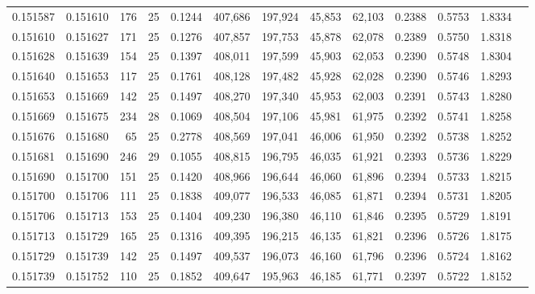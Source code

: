 \begin{tabular}{rrrrrrrrrrrrr}
0.151587 & 0.151610 & 176 &  25 &                                     0.1244 & 407,686 & 197,924 &  45,853 &  62,103 & 0.2388 & 0.5753 & 1.8334 \\
0.151610 & 0.151627 & 171 &  25 &                                     0.1276 & 407,857 & 197,753 &  45,878 &  62,078 & 0.2389 & 0.5750 & 1.8318 \\
0.151628 & 0.151639 & 154 &  25 &                                     0.1397 & 408,011 & 197,599 &  45,903 &  62,053 & 0.2390 & 0.5748 & 1.8304 \\
0.151640 & 0.151653 & 117 &  25 &                                     0.1761 & 408,128 & 197,482 &  45,928 &  62,028 & 0.2390 & 0.5746 & 1.8293 \\
0.151653 & 0.151669 & 142 &  25 &                                     0.1497 & 408,270 & 197,340 &  45,953 &  62,003 & 0.2391 & 0.5743 & 1.8280 \\
0.151669 & 0.151675 & 234 &  28 &                                     0.1069 & 408,504 & 197,106 &  45,981 &  61,975 & 0.2392 & 0.5741 & 1.8258 \\
0.151676 & 0.151680 &  65 &  25 &                                     0.2778 & 408,569 & 197,041 &  46,006 &  61,950 & 0.2392 & 0.5738 & 1.8252 \\
0.151681 & 0.151690 & 246 &  29 &                                     0.1055 & 408,815 & 196,795 &  46,035 &  61,921 & 0.2393 & 0.5736 & 1.8229 \\
0.151690 & 0.151700 & 151 &  25 &                                     0.1420 & 408,966 & 196,644 &  46,060 &  61,896 & 0.2394 & 0.5733 & 1.8215 \\
0.151700 & 0.151706 & 111 &  25 &                                     0.1838 & 409,077 & 196,533 &  46,085 &  61,871 & 0.2394 & 0.5731 & 1.8205 \\
0.151706 & 0.151713 & 153 &  25 &                                     0.1404 & 409,230 & 196,380 &  46,110 &  61,846 & 0.2395 & 0.5729 & 1.8191 \\
0.151713 & 0.151729 & 165 &  25 &                                     0.1316 & 409,395 & 196,215 &  46,135 &  61,821 & 0.2396 & 0.5726 & 1.8175 \\
0.151729 & 0.151739 & 142 &  25 &                                     0.1497 & 409,537 & 196,073 &  46,160 &  61,796 & 0.2396 & 0.5724 & 1.8162 \\
0.151739 & 0.151752 & 110 &  25 &                                     0.1852 & 409,647 & 195,963 &  46,185 &  61,771 & 0.2397 & 0.5722 & 1.8152 \\

\end{tabular}

